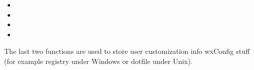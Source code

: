 \begin{itemize}
\item {}
\item {}
\item {}
\item {}
\end{itemize}

The last two functions are used to store user customization info wxConfig stuff
(for example registry under Windows or dotfile under Unix).

